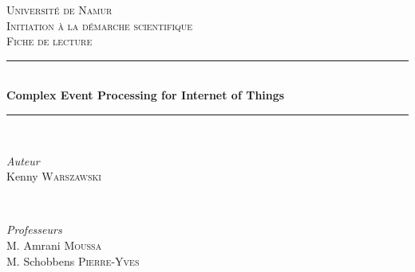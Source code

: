 \documentclass[12pt]{article}
\begin{document}

\begin{titlepage} %
	\newcommand{\HRule}{\rule{\linewidth}{0.5mm}} %
	
	\center %
	
	
	\textsc{\LARGE Université de Namur}\\[1.5cm] %
	
	\textsc{\Large Initiation à la démarche scientifique}\\[0.5cm] %
	
	\textsc{\large Fiche de lecture\\[0.5cm]} %
	
	
	\HRule\\[0.4cm]
	
	{\huge\bfseries Complex Event Processing for Internet of Things }\\[0.4cm] %
	
	\HRule\\[1.5cm]
	
	
	\begin{minipage}{0.4\textwidth}
		\begin{flushleft}
			\textit{Auteur}\\
			
			\large Kenny \textsc{Warszawski}
		\end{flushleft}

	\end{minipage}
	~
	\begin{minipage}{0.5\textwidth}
		\begin{flushright}
			\large
			\textit{Professeurs}\\
			M. Amrani \textsc{Moussa}\\
			M. Schobbens \textsc{Pierre-Yves}
		\end{flushright}
	\end{minipage}
	

\end{titlepage}
\end{document}
